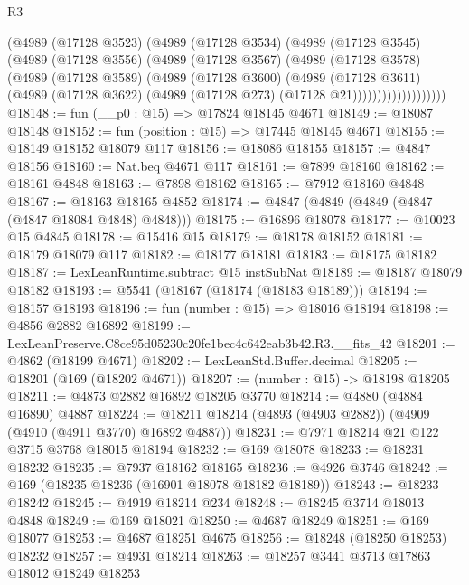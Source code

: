 \begin{lexlean}{R3}
\begin{coremodule}
                  (@4989
                    (@17128 @3523)
                    (@4989
                      (@17128 @3534)
                      (@4989
                        (@17128 @3545)
                        (@4989
                          (@17128 @3556)
                          (@4989
                            (@17128 @3567)
                            (@4989
                              (@17128 @3578)
                              (@4989
                                (@17128 @3589)
                                (@4989
                                  (@17128 @3600)
                                  (@4989
                                    (@17128 @3611)
                                    (@4989
                                      (@17128 @3622)
                                      (@4989 (@17128 @273) (@17128 @21)))))))))))))))))))
@18148 := fun (__p0 : @15) => @17824 @18145 @4671
@18149 := @18087 @18148
@18152 := fun (position : @15) => @17445 @18145 @4671
@18155 := @18149 @18152 @18079 @117
@18156 := @18086 @18155
@18157 := @4847 @18156
@18160 := Nat.beq @4671 @117
@18161 := @7899 @18160
@18162 := @18161 @4848
@18163 := @7898 @18162
@18165 := @7912 @18160 @4848
@18167 := @18163 @18165 @4852
@18174 := @4847 (@4849 (@4849 (@4847 (@4847 @18084 @4848) @4848)))
@18175 := @16896 @18078
@18177 := @10023 @15 @4845
@18178 := @15416 @15
@18179 := @18178 @18152
@18181 := @18179 @18079 @117
@18182 := @18177 @18181
@18183 := @18175 @18182
@18187 := LexLeanRuntime.subtract @15 instSubNat
@18189 := @18187 @18079 @18182
@18193 := @5541 (@18167 (@18174 (@18183 @18189)))
@18194 := @18157 @18193
@18196 := fun (number : @15) => @18016 @18194
@18198 := @4856 @2882 @16892
@18199 := LexLeanPreserve.C8ce95d05230c20fe1bec4c642eab3b42.R3.__fits_42
@18201 := @4862 (@18199 @4671)
@18202 := LexLeanStd.Buffer.decimal
@18205 := @18201 (@169 (@18202 @4671))
@18207 := (number : @15) -> @18198 @18205
@18211 := @4873 @2882 @16892 @18205 @3770
@18214 := @4880 (@4884 @16890) @4887
@18224 := @18211 @18214 (@4893 (@4903 @2882)) (@4909 (@4910 (@4911 @3770) @16892 @4887))
@18231 := @7971 @18214 @21 @122 @3715 @3768 @18015 @18194
@18232 := @169 @18078
@18233 := @18231 @18232
@18235 := @7937 @18162 @18165
@18236 := @4926 @3746
@18242 := @169 (@18235 @18236 (@16901 @18078 @18182 @18189))
@18243 := @18233 @18242
@18245 := @4919 @18214 @234
@18248 := @18245 @3714 @18013 @4848
@18249 := @169 @18021
@18250 := @4687 @18249
@18251 := @169 @18077
@18253 := @4687 @18251 @4675
@18256 := @18248 (@18250 @18253) @18232
@18257 := @4931 @18214
@18263 := @18257 @3441 @3713 @17863 @18012 @18249 @18253

\end{coremodule}
\end{lexlean}
